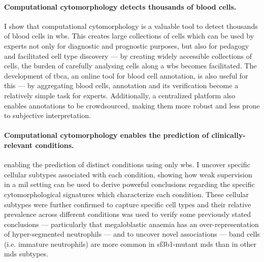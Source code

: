 \paragraph{Computational cytomorphology detects thousands of blood cells.} I show that computational cytomorphology is a valuable tool to detect thousands of blood cells in \ac{wbs}. This creates large collections of cells which can be used by experts not only for diagnostic and prognostic purposes, but also for pedagogy and facilitated cell type discovery --- by creating widely accessible collections of cells, the burden of carefully analysing cells along a \ac{wbs} becomes facilitated. The development of \ac{tbca}, an online tool for blood cell annotation, is also useful for this --- by aggregating blood cells, annotation and its verification become a relatively simple task for experts. Additionally, a centralized platform also enables annotations to be crowdsourced, making them more robust and less prone to subjective interpretation. 

\paragraph{Computational cytomorphology enables the prediction of clinically-relevant conditions.} enabling the prediction of distinct conditions using only \ac{wbs}. I uncover specific cellular subtypes associated with each condition, showing how weak supervision in a \ac{mil} setting can be used to derive powerful conclusions regarding the specific cytomorphological signatures which characterize each condition. These cellular subtypes were further confirmed to capture specific cell types and their relative prevalence across different conditions was used to verify some previously stated conclusions --- particularly that megaloblastic anaemia has an over-representation of hyper-segmented neutrophils --- and to uncover novel associations --- band cells (i.e. immature neutrophils) are more common in \ac{sf3b1}-mutant \ac{mds} than in other \ac{mds} subtypes. %

